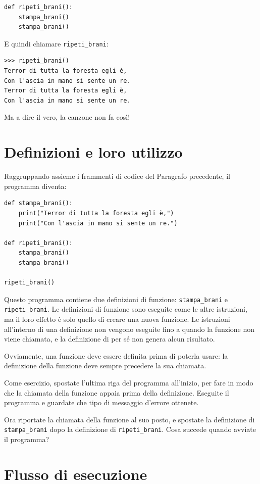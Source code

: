 \documentclass[10pt]{book}
\begin{document}
\begin{verbatim}
def ripeti_brani():
    stampa_brani()
    stampa_brani()
\end{verbatim}
%
E quindi chiamare \verb"ripeti_brani":

\begin{verbatim}
>>> ripeti_brani()
Terror di tutta la foresta egli è,
Con l'ascia in mano si sente un re.
Terror di tutta la foresta egli è,
Con l'ascia in mano si sente un re.
\end{verbatim}
%
Ma a dire il vero, la canzone non fa così!


\section{Definizioni e loro utilizzo}

Raggruppando assieme i frammenti di codice del Paragrafo precedente, il programma diventa:

\begin{verbatim}
def stampa_brani():
    print("Terror di tutta la foresta egli è,")
    print("Con l'ascia in mano si sente un re.")

def ripeti_brani():
    stampa_brani()
    stampa_brani()

ripeti_brani()
\end{verbatim}
%

Questo programma contiene due definizioni di funzione: \verb"stampa_brani" e
\verb"ripeti_brani".  Le definizioni di funzione sono eseguite come le altre istruzioni, ma il loro effetto è solo quello di creare una nuova funzione. Le istruzioni all'interno di una definizione non vengono eseguite fino a quando la funzione non viene chiamata, e la definizione di per sé non genera alcun risultato.

Ovviamente, una funzione deve essere definita prima di poterla usare: la definizione della funzione deve sempre precedere la sua chiamata.

Come esercizio, spostate l'ultima riga del programma all'inizio, per fare in modo che la chiamata della funzione appaia prima della definizione. Eseguite il programma e guardate che tipo di messaggio d'errore ottenete.

Ora riportate la chiamata della funzione al suo posto, e spostate la definizione di \verb"stampa_brani" dopo la definizione di \verb"ripeti_brani". Cosa succede quando avviate il programma?


\section{Flusso di esecuzione}
\end{document}
